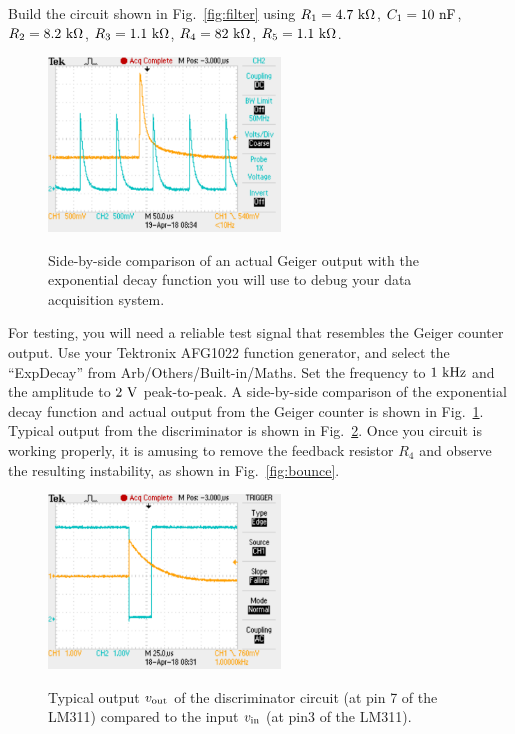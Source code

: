 \documentclass[12pt]{article}
\begin{document}
Build the circuit shown in Fig.~\ref{fig:filter} using $R_1=4.7~{\rm k\Omega}$, $C_1=10~{\rm nF}$,
$R_2=8.2~{\rm k\Omega}$, $R_3=1.1~{\rm k\Omega}$, $R_4=82~{\rm k\Omega}$, $R_5=1.1~{\rm k\Omega}$.  

\begin{figure}[htbp]
\begin{center}
{\includegraphics[width=0.55\textwidth]{figs/fake.pdf}}
\end{center}
\caption{\label{fig:fake} Side-by-side comparison of an actual Geiger output with the exponential decay function you will use to debug your data acquisition system.}
\end{figure}

For testing, you will need a reliable test signal that resembles the Geiger counter output.  Use your Tektronix AFG1022 function generator, and select the ``ExpDecay'' from Arb/Others/Built-in/Maths.
Set the frequency to $1~\rm kHz$ and the amplitude to $2~\rm V$ peak-to-peak.  A side-by-side comparison of the exponential decay function and actual output from the Geiger counter is shown in Fig.~\ref{fig:fake}.  Typical output from the discriminator is shown in Fig.~\ref{fig:typout}.  Once you circuit is working properly, it is amusing to remove the feedback resistor $R_4$ and observe the resulting instability, as shown in Fig.~\ref{fig:bounce}.

\begin{figure}[htbp]
\begin{center}
{\includegraphics[width=0.55\textwidth]{figs/discrim.pdf}}
\end{center}
\caption{\label{fig:typout} Typical output $v_{\rm out}$ of the discriminator circuit (at pin 7 of the LM311) compared to the input $v_{\rm in}$ (at pin3 of the LM311).}
\end{figure}
\end{document}
